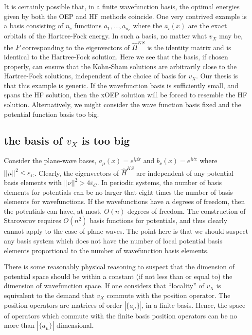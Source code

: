 \documentclass{article}
\newcommand{\norm}[1]{\left|\left|{#1}\right|\right|}
\begin{document}
It is certainly possible that, in a finite wavefunction basis, the optimal
energies given by both the OEP and HF methods coincide.  One very contrived
example is a basis consisting of $n_e$ functions $a_{1},\ldots,a_{n_e}$
where the $a_i(x)$ are the exact orbitals of the Hartree-Fock energy.
In such a basis, no matter what $v_X$ may be, the $P$ corresponding to
the eigenvectors of $\hat{H}^{KS}$ is the identity matrix and is
identical to the Hartree-Fock solution.  Here we see that the
basis, if chosen properly, can ensure that the Kohn-Sham solutions
are arbitrarily close to the Hartree-Fock solutions, independent of the
choice of basis for $v_X$.  Our thesis is that this example is generic.
If the wavefunction basis is sufficiently small, and spans the HF
solution, then the xOEP solution will be forced to resemble the HF solution.
Alternatively, we might consider the wave  function basis fixed and the
potential function basis too big.

\subsection{the basis of $v_X$ is too big}

Consider the plane-wave bases, $a_\mu(x) = e^{i \mu \dot x}$ and
$b_\nu(x) = e^{i \nu \dot x}$ where $\norm{\mu}^2 \le \varepsilon_C$.
Clearly, the eigenvectors of $\hat{H}^{KS}$ are independent of any
potential basis elements with $\norm{\nu}^2 > 4 \varepsilon_C$.
In periodic systems, the number of basis elements for potentials
can be no larger that eight times the number of basis elements for
wavefunctions.  If the wavefunctions have $n$ degrees of freedom,
then the potentials can have, at most, $O(n)$ degrees of freedom.
The construction of Staroverov requires $O(n^2)$ basis functions
for potentials, and thus clearly cannot apply to the case of plane
waves.  The point here is that we should suspect any basis system
which does not have the number of local potential basis elements
proportional to the number of wavefunction basis elements.

There is some reasonably physical reasoning to suspect that the
dimension of potential space should be within a constant (if not
less than or equal to) the dimension of wavefunction space.  If
one considers that ``locality'' of $v_X$ is equivalent to the
demand that $v_X$ commute with the position operator.  The position
operators are matrices of order $|\{a_{\mu}\}|$, in a finite basis.
Hence, the space of operators which commute with the finite basis
position operators can be no more than $|\{a_{\mu}\}|$
dimensional.
\end{document}
